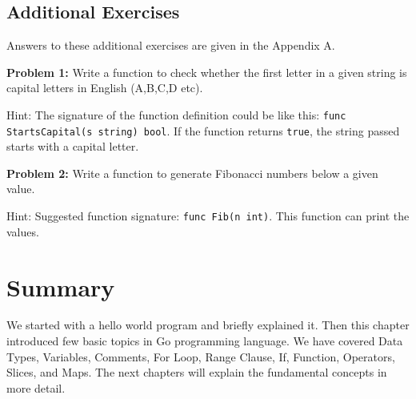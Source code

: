 \subsection{Additional Exercises}

Answers to these additional exercises are given in the Appendix A.

\textbf{Problem 1:} Write a function to check whether the first letter in a
given string is capital letters in English (A,B,C,D etc).

Hint: The signature of the function definition could be like this:
\texttt{func StartsCapital(s string) bool}.  If the function returns
\texttt{true}, the string passed starts with a capital letter.

\textbf{Problem 2:} Write a function to generate Fibonacci numbers below a
given value.

Hint: Suggested function signature: \texttt{func Fib(n int)}.  This
function can print the values.

\section*{Summary}

We started with a hello world program and briefly explained it.  Then
this chapter introduced few basic topics in Go programming language.
We have covered Data Types, Variables, Comments, For Loop, Range
Clause, If, Function, Operators, Slices, and Maps.  The next chapters
will explain the fundamental concepts in more detail.
